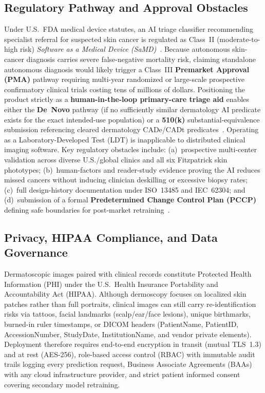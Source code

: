 \subsection{Regulatory Pathway and Approval Obstacles}
Under U.S.\ FDA medical device statutes, an AI triage classifier recommending specialist referral for suspected skin cancer is regulated as Class~II (moderate-to-high risk) \emph{Software as a Medical Device (SaMD)}~\cite{Food2021artificial,Gerke2020need}. Because autonomous skin-cancer diagnosis carries severe false-negative mortality risk, claiming standalone autonomous diagnosis would likely trigger a Class~III \textbf{Premarket Approval (PMA)} pathway requiring multi-year randomized or large-scale prospective confirmatory clinical trials costing tens of millions of dollars. Positioning the product strictly as a \textbf{human-in-the-loop primary-care triage aid} enables either the \textbf{De~Novo} pathway (if no sufficiently similar dermatology AI predicate exists for the exact intended-use population) or a \textbf{510(k)} substantial-equivalence submission referencing cleared dermatology CADe/CADt predicates~\cite{Zhu2022landscape}. Operating as a Laboratory-Developed Test (LDT) is inapplicable to distributed clinical imaging software. Key regulatory obstacles include: (a)~prospective multi-center validation across diverse U.S./global clinics and all six Fitzpatrick skin phototypes; (b)~human-factors and reader-study evidence proving the AI reduces missed cancers without inducing clinician deskilling or excessive biopsy rates; (c)~full design-history documentation under ISO~13485 and IEC~62304; and (d)~submission of a formal \textbf{Predetermined Change Control Plan (PCCP)} defining safe boundaries for post-market retraining~\cite{Food2021artificial}.

\subsection{Privacy, HIPAA Compliance, and Data Governance}
Dermatoscopic images paired with clinical records constitute Protected Health Information (PHI) under the U.S.\ Health Insurance Portability and Accountability Act (HIPAA). Although dermoscopy focuses on localized skin patches rather than full portraits, clinical images can still carry re-identification risks via tattoos, facial landmarks (scalp/ear/face lesions), unique birthmarks, burned-in ruler timestamps, or DICOM headers (PatientName, PatientID, AccessionNumber, StudyDate, InstitutionName, and vendor private elements). Deployment therefore requires end-to-end encryption in transit (mutual TLS~1.3) and at rest (AES-256), role-based access control (RBAC) with immutable audit trails logging every prediction request, Business Associate Agreements (BAAs) with any cloud infrastructure provider, and strict patient informed consent covering secondary model retraining.

